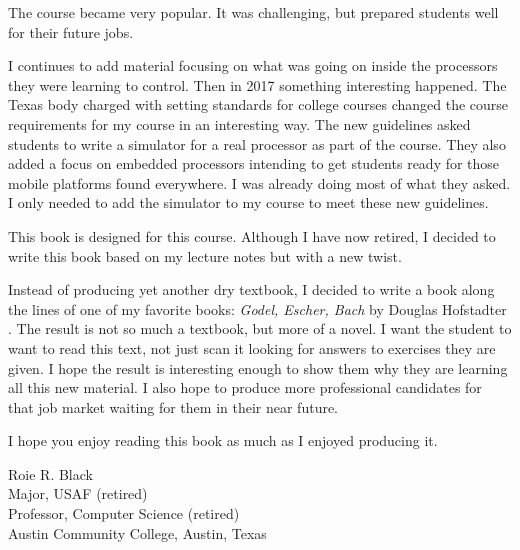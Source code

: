 The course became very popular. It was challenging, but prepared students well
for their future jobs.

I continues to add material focusing on what was going on inside the processors
they were learning to control. Then in 2017 something interesting happened. The
Texas body charged with setting standards for college courses changed the
course requirements for my course in an interesting way. The new guidelines
asked students to write a simulator for a real processor as part of the course.
They also added a focus on embedded processors intending to get students ready
for those mobile platforms found everywhere. I was already doing most of what
they asked. I only needed to add the simulator to my course to meet these new
guidelines.

This book is designed for this course. Although I have now retired, I decided
to write this book based on my lecture notes but with a new twist.

Instead of producing yet another dry textbook, I decided to write a book along
the lines of one of my favorite books: \emph{Godel, Escher, Bach} by Douglas
Hofstadter \cite{Hofstadter:1999}. The result is not so much a textbook, but more
of a novel. I want the student to want to read this text, not just scan it
looking for answers to exercises they are given. I hope the result is
interesting enough to show them why they are learning all this new material. I
also hope to produce more professional candidates for that job market waiting
for them in their near future.

I hope you enjoy reading this book as much as I enjoyed producing it.

Roie R. Black \\
Major, USAF (retired) \\
Professor, Computer Science (retired) \\
Austin Community College, Austin, Texas
